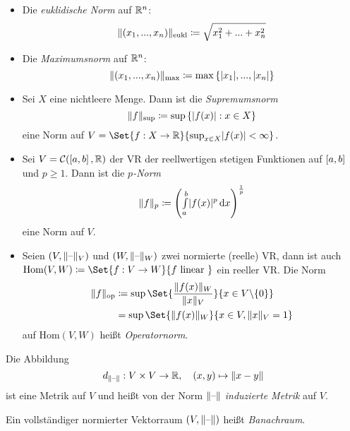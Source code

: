 \documentclass{cheat-sheet}
\begin{document}
\begin{bem}
\begin{itemize}
  \item Die \emph{euklidische Norm} auf $\mathbb{R}^n$:
  \[ \lVert(x_1, ..., x_n)\rVert_{\text{eukl}} \coloneqq \sqrt{x_1^2 + ... + x_n^2} \]
  \item Die \emph{Maximumsnorm} auf $\mathbb{R}^n$:
  \[ \lVert(x_1, ..., x_n)\rVert_{\text{max}} \coloneqq \max \left\{ \lvert x_1\rvert, ..., \lvert x_n\rvert \right\} \]
  \item Sei $X$ eine nichtleere Menge. Dann ist die \emph{Supremumsnorm}
  \[ \lVert f\rVert_{\text{sup}} \coloneqq \sup\left\{ \lvert f(x)\rvert : x \in X \right\} \]
  eine Norm auf $V = \Set{ f : X \to \R }{ \sup_{x \in X} \abs{f(x)} < \infty }$.
  \item Sei $V = \mathcal{C}(\left[ a, b \right], \mathbb{R})$ der VR der reellwertigen stetigen Funktionen auf $\left[ a, b \right]$ und $p \ge 1$. Dann ist die \emph{$p$-Norm}
  \[ \lVert f\rVert_{p} \coloneqq \left( {\textstyle \int\limits_{a}^{b}} \lvert f(x)\rvert^p \,\mathrm{d} x \right)^{\frac{1}{p}} \]
  eine Norm auf $V$.
  \item Seien $(V, \lVert\text{--}\rVert_V)$ und $(W, \lVert\text{--}\rVert_W)$ zwei normierte (reelle) VR, dann ist auch $\mathrm{Hom}(V, W) \coloneqq \Set{ f : V \to W }{ f \text{ linear } }$ ein reeller VR. Die Norm
  \begin{align*}
    \norm{f}_{\text{op}} &\coloneqq \sup \Set{ \frac{ \norm{f(x)}_W }{ \norm{x}_V } }{ x \in V \backslash \{ 0 \} }\\
      &= \sup \Set{ \norm{f(x)}_W }{ x \in V, \norm{x}_V = 1 }
  \end{align*}
  auf $\mathrm{Hom}(V, W)$ heißt \emph{Operatornorm}.
\end{itemize}
\end{bem}


\begin{defn}
Die Abbildung
\[ d_{\lVert\text{--}\rVert} : V \times V \to \mathbb{R},\quad (x, y) \mapsto \lVert x - y\rVert \]
ist eine Metrik auf $V$ und heißt von der Norm $\lVert\text{--}\rVert$ \emph{induzierte Metrik} auf $V$.
\end{defn}

\begin{defn}
Ein vollständiger normierter Vektorraum $(V, \lVert\text{--}\rVert)$ heißt \emph{Banachraum}.
\end{defn}
\end{document}
